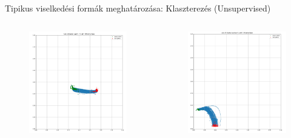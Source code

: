 \documentclass{beamer}
\begin{document}
\begin{frame}{Tipikus viselkedési formák meghatározása: Klaszterezés (Unsupervised)}
\begin{columns}
\begin{figure}
            \includegraphics[scale=0.1]{../clustering/n_cluster_3_n_tracks_892_cropped.jpg}
        \end{figure}
        \begin{figure}
            \includegraphics[scale=0.1]{../clustering/n_cluster_5_n_tracks_130_cropped.jpg}
        \end{figure}
    \end{columns}
\end{frame}
\end{document}
